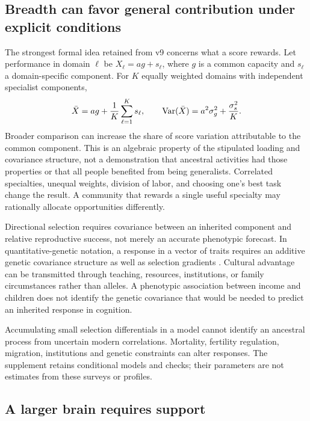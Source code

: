 \subsection{Breadth can favor general contribution under explicit conditions}

The strongest formal idea retained from v9 concerns what a score rewards. Let performance in domain $\ell$ be $X_\ell=a g+s_\ell$, where $g$ is a common capacity and $s_\ell$ a domain-specific component. For $K$ equally weighted domains with independent specialist components,
\begin{equation}
\bar X=a g+\frac{1}{K}\sum_{\ell=1}^{K}s_\ell,\qquad
\operatorname{Var}(\bar X)=a^2\sigma_g^2+\frac{\sigma_s^2}{K}.
\label{eq:minds-breadth}
\end{equation}
Broader comparison can increase the share of score variation attributable to the common component. This is an algebraic property of the stipulated loading and covariance structure, not a demonstration that ancestral activities had those properties or that all people benefited from being generalists. Correlated specialties, unequal weights, division of labor, and choosing one's best task change the result. A community that rewards a single useful specialty may rationally allocate opportunities differently.

Directional selection requires covariance between an inherited component and relative reproductive success, not merely an accurate phenotypic forecast. In quantitative-genetic notation, a response in a vector of traits requires an additive genetic covariance structure as well as selection gradients \citep{lande1983,hazel1943}. Cultural advantage can be transmitted through teaching, resources, institutions, or family circumstances rather than alleles. A phenotypic association between income and children does not identify the genetic covariance that would be needed to predict an inherited response in cognition.

Accumulating small selection differentials in a model cannot identify an ancestral process from uncertain modern correlations. Mortality, fertility regulation, migration, institutions and genetic constraints can alter responses. The supplement retains conditional models and checks; their parameters are not estimates from these surveys or profiles.

\subsection{A larger brain requires support}


